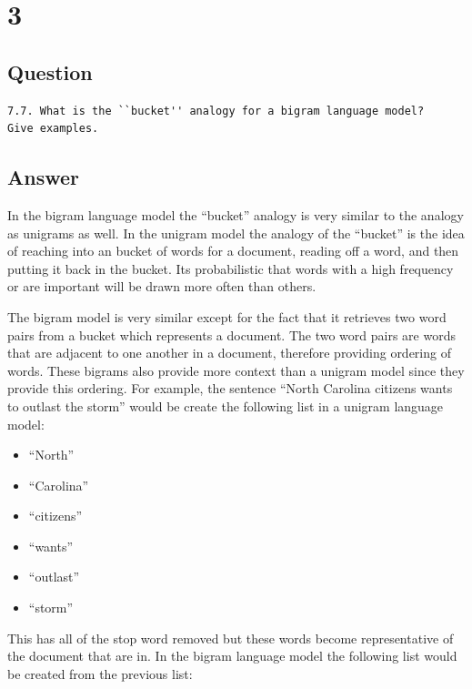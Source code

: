 \documentclass[letterpaper,11pt]{article}
\begin{document}
\clearpage


\section*{3}

\subsection*{Question}

\begin{verbatim}
7.7. What is the ``bucket'' analogy for a bigram language model?
Give examples.
\end{verbatim}

\subsection*{Answer}

In the bigram language model the ``bucket'' analogy is very similar to the analogy as unigrams as well.
In the unigram model the analogy of the ``bucket'' is the idea of reaching into an bucket of words for a document, reading off a word, and then putting it back in the bucket.
Its probabilistic that words with a high frequency or are important will be drawn more often than others.

The bigram model is very similar except for the fact that it retrieves two word pairs from a bucket which represents a document.
The two word pairs are words that are adjacent to one another in a document, therefore providing ordering of words.
These bigrams also provide more context than a unigram model since they provide this ordering. 
For example, the sentence ``North Carolina citizens wants to outlast the storm'' would be create the following list in a unigram language model:

\begin{itemize}
  \item ``North''
  \item ``Carolina''
  \item ``citizens''
  \item ``wants''
  \item ``outlast''
  \item ``storm''
\end{itemize}

This has all of the stop word removed but these words become representative of the document that are in.
In the bigram language model the following list would be created from the previous list:
\end{document}
